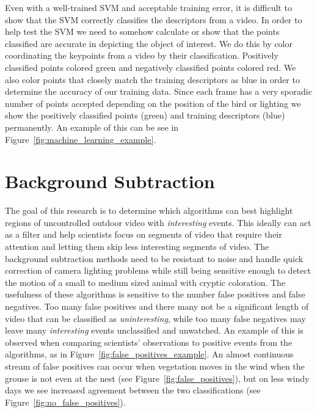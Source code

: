 Even with a well-trained SVM and acceptable training error, it is difficult to show that the SVM correctly classifies the descriptors from a video. In order to help test the SVM we need to somehow calculate or show that the points classified are accurate in depicting the object of interest. We do this by color coordinating the keypoints from a video by their classification. Positively classified points colored green and negatively classified points colored red. We also color points that closely match the training descriptors as blue in order to determine the accuracy of our training data. Since each frame has a very sporadic number of points accepted depending on the position of the bird or lighting we show the positively classified points (green) and training descriptors (blue) permanently. An example of this can be see in Figure~\ref{fig:machine_learning_example}.


\section{Background Subtraction}
\label{sec:methods_background_subtraction}

The goal of this research is to determine which algorithms can best highlight regions of uncontrolled outdoor video with \emph{interesting} events. This ideally can act as a filter and help scientists focus on segments of video that require their attention and letting them skip less interesting segments of video. The background subtraction methods need to be resistant to noise and handle quick correction of camera lighting problems while still being sensitive enough to detect the motion of a small to medium sized animal with cryptic coloration. The usefulness of these algorithms is sensitive to the number false positives and false negatives. Too many false positives and there many not be a significant length of video that can be classified as \emph{uninteresting}, while too many false negatives may leave many \emph{interesting} events unclassified and unwatched. An example of this is observed when comparing scientists' observations to positive events from the algorithms, as in Figure~\ref{fig:false_positives_example}. An almost continuous stream of false positives can occur when vegetation moves in the wind when the grouse is not even at the nest (see Figure~\ref{fig:false_positives}), but on less windy days we see increased agreement between the two classifications (see Figure~\ref{fig:no_false_positives}).


